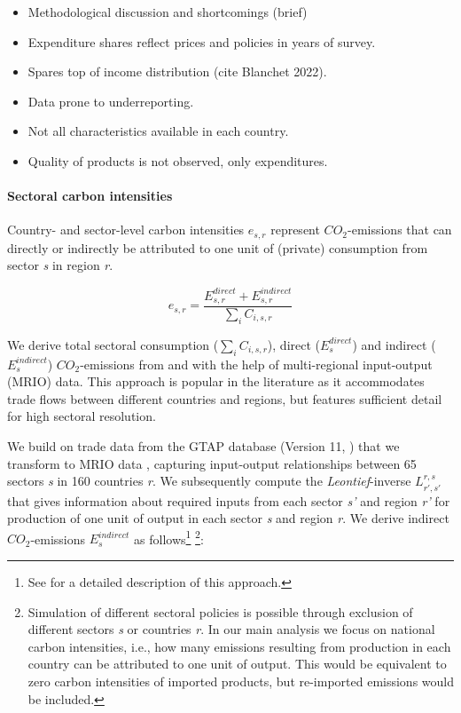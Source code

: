 \documentclass[12pt, a4paper]{article}
\begin{document}
\begin{itemize}
    \item Methodological discussion and shortcomings (brief)
    \item Expenditure shares reflect prices and policies in years of survey. 
    \item Spares top of income distribution (cite Blanchet 2022).
    \item Data prone to underreporting.
    \item Not all characteristics available in each country.
    \item Quality of products is not observed, only expenditures. 
\end{itemize}


\paragraph{Sectoral carbon intensities} Country- and sector-level carbon intensities $e_{s,r}$ represent $CO_{2}$-emissions that can directly or indirectly be attributed to one unit of (private) consumption from sector \textit{s} in region \textit{r}.

\begin{equation}
    e_{s,r} = \frac{E_{s,r}^{direct}+E_{s,r}^{indirect}}{\sum_{i} C_{i,s,r}}
\end{equation}

We derive total sectoral consumption ($\sum_{i} C_{i,s,r}$), direct ($E_{s}^{direct}$) and indirect ($E_{s}^{indirect}$) $CO_{2}$-emissions from and with the help of multi-regional input-output (MRIO) data. This approach is popular in the literature as it accommodates trade flows between different countries and regions, but features sufficient detail for high sectoral resolution. 

We build on trade data from the GTAP database (Version 11,  \textcite{Aguiar.2022}) that we transform to MRIO data \autocite{Peters.2011}, capturing input-output relationships between 65 sectors \textit{s} in 160 countries \textit{r}. We subsequently compute the \textit{Leontief}-inverse $L_{r',s'}^{r,s}$ that gives information about required inputs from each sector \textit{s'} and region \textit{r'} for production of one unit of output in each sector \textit{s} and region \textit{r}. We derive indirect $CO_{2}$-emissions $E_{s}^{indirect}$ as follows\footnote{See \textcite{Missbach.2023b, Steckel.2021b,Feindt.2021,VogtSchilb.2019} for a detailed description of this approach.} \footnote{Simulation of different sectoral policies is possible through exclusion of different sectors \textit{s} or countries \textit{r}. In our main analysis we focus on national carbon intensities, i.e., how many emissions resulting from production in each country can be attributed to one unit of output. This would be equivalent to zero carbon intensities of imported products, but re-imported emissions would be included.}:
\end{document}
